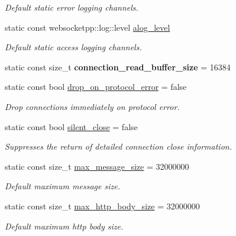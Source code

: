 \begin{DoxyCompactItemize}
\begin{DoxyCompactList}\small\item\em Default static error logging channels. \end{DoxyCompactList}\item 
static const websocketpp\+::log\+::level \mbox{\hyperlink{structwebsocketpp_1_1config_1_1minimal__server_ae71d1728a8d49acd97ec29a6fdfd440c}{alog\+\_\+level}}
\begin{DoxyCompactList}\small\item\em Default static access logging channels. \end{DoxyCompactList}\item 
\mbox{\label{structwebsocketpp_1_1config_1_1minimal__server_a8fe8ba843966319a144337f8620648f3}} 
static const size\+\_\+t {\bfseries connection\+\_\+read\+\_\+buffer\+\_\+size} = 16384
\item 
static const bool \mbox{\hyperlink{structwebsocketpp_1_1config_1_1minimal__server_aab09bf45ad78310426a04636ad64c2bd}{drop\+\_\+on\+\_\+protocol\+\_\+error}} = false
\begin{DoxyCompactList}\small\item\em Drop connections immediately on protocol error. \end{DoxyCompactList}\item 
static const bool \mbox{\hyperlink{structwebsocketpp_1_1config_1_1minimal__server_a2628ceea7ff3671afac22317f979e9c1}{silent\+\_\+close}} = false
\begin{DoxyCompactList}\small\item\em Suppresses the return of detailed connection close information. \end{DoxyCompactList}\item 
static const size\+\_\+t \mbox{\hyperlink{structwebsocketpp_1_1config_1_1minimal__server_adfad5099419b8e2090c3667d17e10008}{max\+\_\+message\+\_\+size}} = 32000000
\begin{DoxyCompactList}\small\item\em Default maximum message size. \end{DoxyCompactList}\item 
static const size\+\_\+t \mbox{\hyperlink{structwebsocketpp_1_1config_1_1minimal__server_a56756239e0904949156e630c1f48d95e}{max\+\_\+http\+\_\+body\+\_\+size}} = 32000000
\begin{DoxyCompactList}\small\item\em Default maximum http body size. \end{DoxyCompactList}\item 

\end{DoxyCompactItemize}
